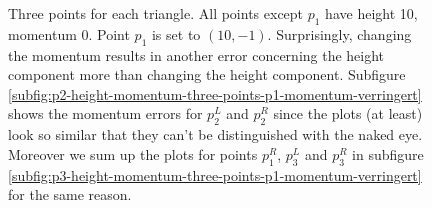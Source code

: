 \begin{figure}[ht!]

  \caption{Three points for each triangle. All points except $p_1$ have height 10, momentum 0. Point $p_1$ is set to $(10,-1)$. Surprisingly, changing the momentum results in  another error concerning the height component more than changing the height component. Subfigure \ref{subfig:p2-height-momentum-three-points-p1-momentum-verringert} shows the momentum errors for $p_2^L$ and $p_2^R$ since the plots (at least) look so similar that they can't be distinguished with the naked eye. Moreover we sum up the plots for points $p_1^R$, $p_3^L$ and $p_3^R$ in subfigure \ref{subfig:p3-height-momentum-three-points-p1-momentum-verringert} for the same reason.
}
  \label{fig:three-points-u1-}
\end{figure}


